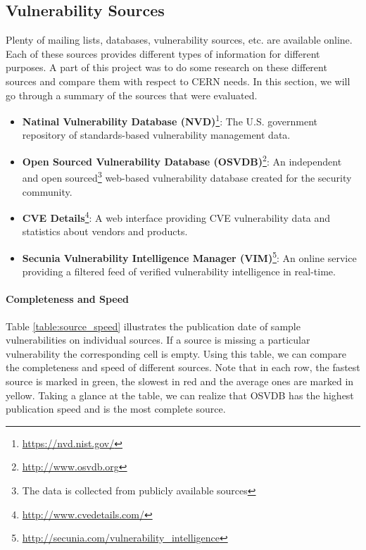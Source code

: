 \subsection{Vulnerability Sources}
\label{vuln_sources}
Plenty of mailing lists, databases, vulnerability sources, etc. are available online. Each of these sources provides different types of information for different purposes. A part of this project was to do some research on these different sources and compare them with respect to CERN needs. In this section, we will go through a summary of the sources that were evaluated. 
\begin{itemize}
\item \textbf{Natinal Vulnerability Database (NVD)}\footnote{\url{https://nvd.nist.gov/}}: The U.S. government repository of standards-based vulnerability management data.
\item \textbf{Open Sourced Vulnerability Database (OSVDB)}\footnote{\url{http://www.osvdb.org}}: An independent and open sourced\footnote{The data is collected from publicly available sources} web-based vulnerability database created for the security community. 
\item \textbf{CVE Details}\footnote{\url{http://www.cvedetails.com/}}: A web interface providing CVE vulnerability data and statistics about vendors and products.
\item \textbf{Secunia Vulnerability Intelligence Manager (VIM)}\footnote{\url{http://secunia.com/vulnerability_intelligence}}: An online service providing a filtered feed of verified vulnerability intelligence in real-time.

\end{itemize}
\paragraph{Completeness and Speed}
Table \ref{table:source_speed} illustrates the publication date of sample vulnerabilities on individual sources. If a source is missing a particular vulnerability the corresponding cell is empty. Using this table, we can compare the completeness and speed of different sources. Note that in each row, the fastest source is marked in green, the slowest in red and the average ones are marked in yellow. Taking a glance at the table, we can realize that OSVDB has the highest publication speed and is the most complete source.

